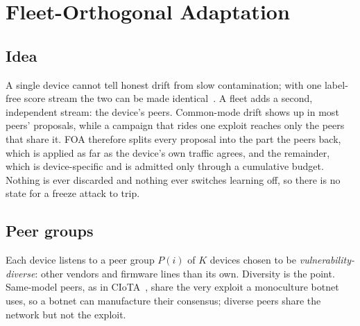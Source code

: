 \section{Fleet-Orthogonal Adaptation}\label{sec:design}

\subsection{Idea}
A single device cannot tell honest drift from slow contamination; with one label-free score stream the
two can be made identical~\cite{warden}. A fleet adds a second, independent stream: the device's peers.
Common-mode drift shows up in most peers' proposals, while a campaign that rides one exploit reaches only
the peers that share it. FOA therefore splits every proposal into the part the peers back, which is
applied as far as the device's own traffic agrees, and the remainder, which is device-specific and is admitted only through a cumulative
budget. Nothing is ever discarded and nothing ever switches learning off, so there is no state for a
freeze attack to trip.

\subsection{Peer groups}
Each device listens to a peer group $P(i)$ of $K$ devices chosen to be \emph{vulnerability-diverse}:
other vendors and firmware lines than its own. Diversity is the point. Same-model peers, as in
CIoTA~\cite{ciota}, share the very exploit a monoculture botnet uses, so a botnet can manufacture their
consensus; diverse peers share the network but not the exploit.

